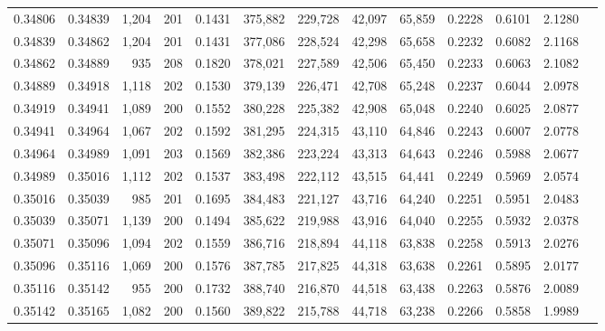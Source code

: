 \begin{tabular}{rrrrrrrrrrrrr}
0.34806 & 0.34839 & 1,204 & 201 &                                     0.1431 & 375,882 & 229,728 &  42,097 &  65,859 & 0.2228 & 0.6101 & 2.1280 \\
0.34839 & 0.34862 & 1,204 & 201 &                                     0.1431 & 377,086 & 228,524 &  42,298 &  65,658 & 0.2232 & 0.6082 & 2.1168 \\
0.34862 & 0.34889 &   935 & 208 &                                     0.1820 & 378,021 & 227,589 &  42,506 &  65,450 & 0.2233 & 0.6063 & 2.1082 \\
0.34889 & 0.34918 & 1,118 & 202 &                                     0.1530 & 379,139 & 226,471 &  42,708 &  65,248 & 0.2237 & 0.6044 & 2.0978 \\
0.34919 & 0.34941 & 1,089 & 200 &                                     0.1552 & 380,228 & 225,382 &  42,908 &  65,048 & 0.2240 & 0.6025 & 2.0877 \\
0.34941 & 0.34964 & 1,067 & 202 &                                     0.1592 & 381,295 & 224,315 &  43,110 &  64,846 & 0.2243 & 0.6007 & 2.0778 \\
0.34964 & 0.34989 & 1,091 & 203 &                                     0.1569 & 382,386 & 223,224 &  43,313 &  64,643 & 0.2246 & 0.5988 & 2.0677 \\
0.34989 & 0.35016 & 1,112 & 202 &                                     0.1537 & 383,498 & 222,112 &  43,515 &  64,441 & 0.2249 & 0.5969 & 2.0574 \\
0.35016 & 0.35039 &   985 & 201 &                                     0.1695 & 384,483 & 221,127 &  43,716 &  64,240 & 0.2251 & 0.5951 & 2.0483 \\
0.35039 & 0.35071 & 1,139 & 200 &                                     0.1494 & 385,622 & 219,988 &  43,916 &  64,040 & 0.2255 & 0.5932 & 2.0378 \\
0.35071 & 0.35096 & 1,094 & 202 &                                     0.1559 & 386,716 & 218,894 &  44,118 &  63,838 & 0.2258 & 0.5913 & 2.0276 \\
0.35096 & 0.35116 & 1,069 & 200 &                                     0.1576 & 387,785 & 217,825 &  44,318 &  63,638 & 0.2261 & 0.5895 & 2.0177 \\
0.35116 & 0.35142 &   955 & 200 &                                     0.1732 & 388,740 & 216,870 &  44,518 &  63,438 & 0.2263 & 0.5876 & 2.0089 \\
0.35142 & 0.35165 & 1,082 & 200 &                                     0.1560 & 389,822 & 215,788 &  44,718 &  63,238 & 0.2266 & 0.5858 & 1.9989 \\

\end{tabular}
